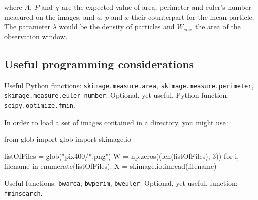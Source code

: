 where $A$, $P$ and $\chi$ are the expected value of area, perimeter and euler's number measured on the images, and $a$, $p$ and $x$ their counterpart for the mean particle. The parameter $\lambda$ would be the density of particles and $W_{size}$ the area of the observation window.

\subsection{Useful programming considerations}

\begin{pcomment}
 \begin{premark}
Useful Python functions: \texttt{skimage.measure.area}, \texttt{skimage.measure.perimeter}, \texttt{skimage.measure.euler\_number}.
Optional, yet useful, Python function: \texttt{scipy.optimize.fmin}.
 \end{premark}

 In order to load a set of images contained in a directory, you might use:
 \begin{python}
from glob import glob
import skimage.io

listOfFiles = glob("pix400/*.png")
W = np.zeros((len(listOfFiles), 3))
for i, filename in enumerate(listOfFiles):
    X = skimage.io.imread(filename)
 \end{python}

\end{pcomment}

\begin{mcomment}
 \begin{mremark}
  
Useful \matlabregistered{} functions: \texttt{bwarea}, \texttt{bwperim}, \texttt{bweuler}.
Optional, yet useful, \matlabregistered{} function: \texttt{fminsearch}.
 \end{mremark}

\end{mcomment}





